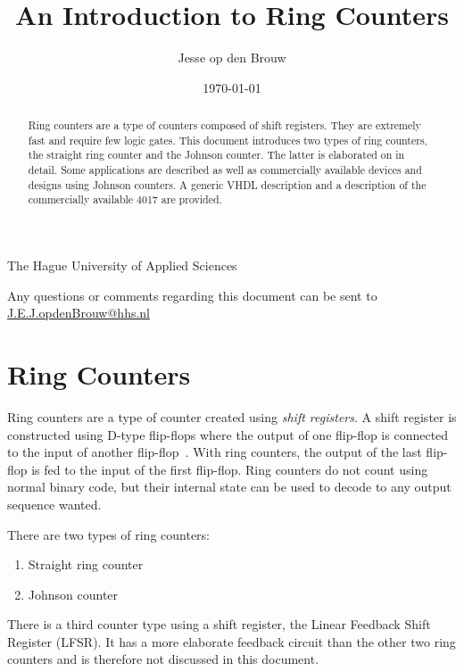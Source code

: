 \documentclass[12pt,a4paper,final,twoside,fleqn]{article}
\author{Jesse op den Brouw}
\title{An Introduction to Ring Counters}
\date{\today}
\makeatletter
\def\maketitle{%
  \null
  \thispagestyle{empty}%
  \vskip 3cm
  \begin{center}\leavevmode
    {\LARGE \@title\par}%
    \vskip 1cm
    {\large \@author\par}%
    \vskip 0.03cm
    {\large The Hague University of Applied Sciences\par}%
    \vskip 0.03cm
    {\large \@date\par}%
  \end{center}%
  \vfill
  \null
}
\makeatother
\begin{document}
\maketitle
\begin{abstract}
\noindent
Ring counters are a type of counters composed of shift registers. They are extremely
fast and require few logic gates. This document introduces two types of ring counters,
the straight ring counter and the Johnson counter. The latter is elaborated on in
detail. Some applications are described as well as commercially available devices
and designs using Johnson counters. A generic VHDL description and a description of
the commercially available 4017 are provided.
\end{abstract}
\vspace*{2cm}

\clearpage
\renewcommand\contentsname{Table of Contents}
\tableofcontents
\vspace{1cm}
\listoffigures
\vspace{1cm}
\renewcommand{\lstlistlistingname}{List of Listings}
\lstlistoflistings
\vfill
{\small
Any questions or comments regarding this document can be sent to
\href{mailto:J.E.J.opdenBrouw@hhs.nl}{J.E.J.opdenBrouw@hhs.nl}
}
\clearpage


\section{Ring Counters}
Ring counters are a type of counter created using \textsl{shift registers}. A shift
register is constructed using D-type flip-flops where the output of one flip-flop
is connected to the input of another flip-flop~\cite{morrismano2006}. With ring
counters, the output of the last flip-flop is fed to the input of the first flip-flop.
Ring counters do not count using normal binary code, but their internal state can be
used to decode to any output sequence wanted.

There are two types of ring counters:

\begin{enumerate}[label={\alph*})]
 \item Straight ring counter
 \item Johnson counter
\end{enumerate}

There is a third counter type using a shift register, the Linear Feedback Shift
Register (LFSR). It has a more elaborate feedback circuit than the other two ring
counters and is therefore not discussed in this document.
\end{document}
